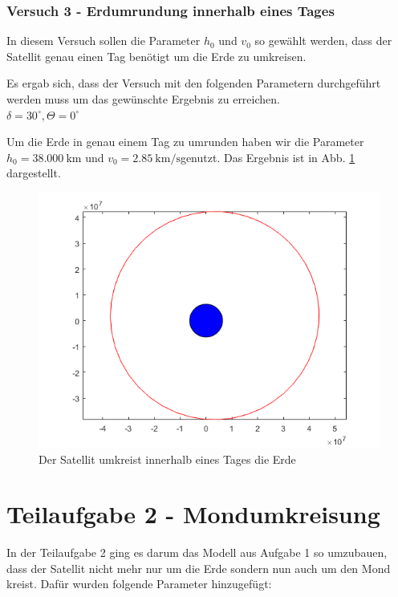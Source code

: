 \documentclass[]{scrartcl}
\begin{document}
\subsubsection{Versuch 3 - Erdumrundung innerhalb eines Tages}
In diesem Versuch sollen die Parameter $h_0$ und $v_0$ so gewählt werden, dass der Satellit genau einen Tag benötigt um die Erde zu umkreisen.

Es ergab sich, dass der Versuch mit den folgenden Parametern durchgeführt werden muss um das gewünschte Ergebnis zu erreichen.\\
 $\delta = 30^\circ, \Theta = 0^\circ $ 
 
Um die Erde in genau einem Tag zu umrunden haben wir die Parameter $h_0 = \SI{38.000}{\km}$ und $v_0 = \SI[per-mode=fraction]{2,85}{\km\per\second}$genutzt. Das Ergebnis ist in Abb. \ref{fig:1_einTagKreisbahn} dargestellt.

\begin{figure}[H]
\centering
\includegraphics[width=1\linewidth]{./1_einTagKreisbahn}
\caption{Der Satellit umkreist innerhalb eines Tages die Erde}
\label{fig:1_einTagKreisbahn}
\end{figure}

\section{Teilaufgabe 2 - Mondumkreisung}
In der Teilaufgabe 2 ging es darum das Modell aus Aufgabe 1 so umzubauen, dass der Satellit nicht mehr nur um die Erde sondern nun auch um den Mond kreist. Dafür wurden folgende Parameter hinzugefügt:
\end{document}
